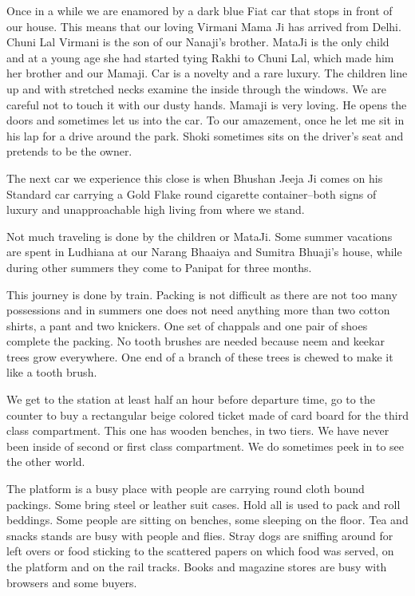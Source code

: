 Once in a while we are enamored by a dark blue Fiat car that stops in
front of our house. This means that our loving Virmani Mama Ji has arrived
from Delhi. Chuni Lal Virmani is the son of our Nanaji's brother. MataJi
is the only child and at a young age she had started tying Rakhi to Chuni
Lal, which made him her brother and our Mamaji. Car is a novelty and
a rare luxury. The children line up and with stretched necks examine the
inside through the windows. We are careful not to touch it with our dusty
hands. Mamaji is very loving. He opens the doors and sometimes let us into
the car. To our amazement, once he let me sit in his lap for a drive
around the park. Shoki sometimes sits on the driver's seat and pretends to
be the owner.

The next car we experience this close is when Bhushan Jeeja Ji comes on
his Standard car carrying a Gold Flake round cigarette container--both
signs of luxury and unapproachable high living from where we stand.

Not much traveling is done by the children or MataJi. Some summer
vacations are spent in Ludhiana at our Narang Bhaaiya and Sumitra Bhuaji's
house, while during other summers they come to Panipat for three months.

This journey is done by train. Packing is not difficult as there are not
too many possessions and in summers one does not need anything more than
two cotton shirts, a pant and two knickers. One set of chappals and one
pair of shoes complete the packing. No tooth brushes are needed because
neem and keekar trees grow everywhere. One end of a branch of these trees
is chewed to make it like a tooth brush.

We get to the station at least half an hour before departure time, go to
the counter to buy a rectangular beige colored ticket made of card board
for the third class compartment. This one has wooden benches, in two
tiers. We have never been inside of second or first class compartment. We
do sometimes peek in to see the other world.

The platform is a busy place with people are carrying round cloth bound
packings. Some bring steel or leather suit cases. Hold all is used to pack
and roll beddings. Some people are sitting on benches, some sleeping on
the floor. Tea and snacks stands are busy with people and flies. Stray
dogs are sniffing around for left overs or food sticking to the scattered
papers on which food was served, on the platform and on the rail tracks.
Books and magazine stores are busy with browsers and some buyers.

